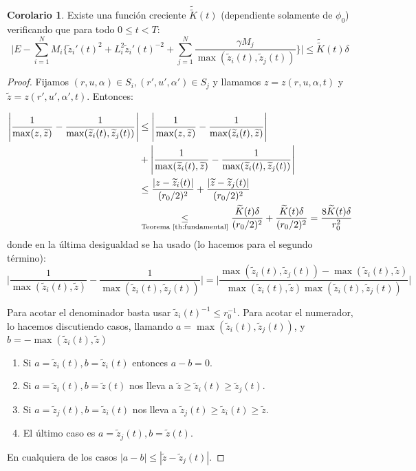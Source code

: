 \documentclass[a4paper,10pt]{scrartcl}
\theoremstyle{definition}
\newtheorem{corollary}{Corolario}
\newcommand{\ktilde}{\widetilde{K}}
\newcommand{\dtilde}[1]{\widetilde{\widetilde{#1}}}
\numberwithin{equation}{section}
\begin{document}
\begin{corollary}
 Existe una función creciente $\dtilde{K}(t)$ (dependiente solamente de $\phi_0$) verificando que para todo $0 \le t < T$:
 \[
  \Bigg|E - \sum_{i=1}^N M_i\bigg\{\widetilde{z}_i'(t)^2 + L_i^2\widetilde{z}_i'(t)^{-2} + \sum_{j=1}^N \frac{\gamma M_j}{\max(\widetilde{z}_i(t), \widetilde{z}_j(t))}\bigg\} \Bigg| \le \dtilde{K}(t) \delta
 \]
\end{corollary}
\begin{proof}
 Fijamos $(r,u,\alpha) \in S_i, (r',u',\alpha') \in S_j$ y llamamos $z = z(r,u,\alpha,t)$ y $\widetilde{z} = z(r',u',\alpha',t)$. Entonces:
 
 \begin{align*}
 \Bigg|\frac{1}{\max(z,\widetilde{z})} - \frac{1}{\max(\widetilde{z}_i(t), \widetilde{z}_j(t))} \Bigg| &\le \Bigg|\frac{1}{\max(z,\widetilde{z})} - \frac{1}{\max(\widetilde{z}_i(t),\widetilde{z})} \Bigg|\\
 &+ \Bigg|\frac{1}{\max(\widetilde{z}_i(t),\widetilde{z})} - \frac{1}{\max(\widetilde{z}_i(t), \widetilde{z}_j(t))}\Bigg|\\
 &\le \frac{|z-\widetilde{z}_i(t)|}{(r_0/2)^2} + \frac{|\widetilde{z}-\widetilde{z}_j(t)|}{(r_0/2)^2}\\
 &\underset{\textrm{Teorema \ref{th:fundamental}}}{\le} \frac{\ktilde(t)\delta}{(r_0/2)^2} + \frac{\ktilde(t)\delta}{(r_0/2)^2} = \frac{8\ktilde(t)\delta}{r_0^2}
 \end{align*}
donde en la última desigualdad se ha usado (lo hacemos para el segundo término):
\[
  \Bigg|\frac{1}{\max(\widetilde{z}_i(t),\widetilde{z})} - \frac{1}{\max(\widetilde{z}_i(t), \widetilde{z}_j(t))}\Bigg| = \Bigg|\frac{\max(\widetilde{z}_i(t), \widetilde{z}_j(t)) - \max(\widetilde{z}_i(t), \widetilde{z})}{\max(\widetilde{z}_i(t),\widetilde{z}) \max(\widetilde{z}_i(t), \widetilde{z}_j(t))} \Bigg|
\]

Para acotar el denominador basta usar $\widetilde{z}_i(t)^{-1} \le r_0^{-1}$. Para acotar el numerador, lo hacemos discutiendo casos, llamando $a = \max(\widetilde{z}_i(t), \widetilde{z}_j(t))$, y $b= - \max(\widetilde{z}_i(t), \widetilde{z})$ 

\begin{enumerate}
 \item Si $a= \widetilde{z}_i(t), b=\widetilde{z}_i(t)$ entonces $a-b = 0$.
 \item Si $a = \widetilde{z}_i(t), b = \widetilde{z}(t)$ nos lleva a $\widetilde{z} \ge \widetilde{z}_i(t)\ge \widetilde{z}_j(t)$.
 \item Si $a = \widetilde{z}_j(t), b = \widetilde{z}_i(t)$ nos lleva a $\widetilde{z}_j(t) \ge \widetilde{z}_i(t) \ge \widetilde{z}$.
 \item El último caso es $a = \widetilde{z}_j(t), b = \widetilde{z}(t)$.
\end{enumerate}
En cualquiera de los casos $|a-b| \le |\widetilde{z} - \widetilde{z}_j(t)|$.


\end{proof}
\end{document}

